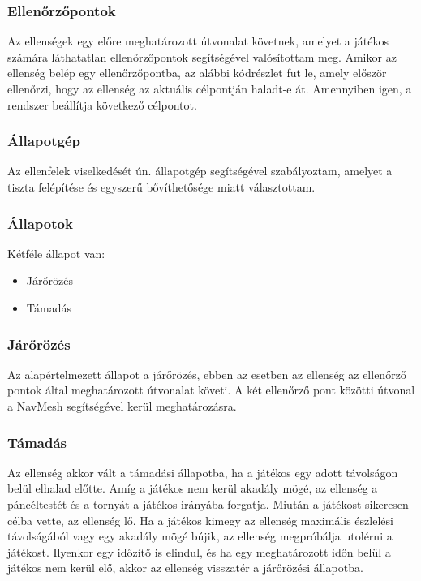 \documentclass[
]{thesis-ekf}
\theoremstyle{definition}
\theoremstyle{remark}
\begin{document}
\subsubsection{Ellenőrzőpontok}

Az ellenségek egy előre meghatározott útvonalat követnek, amelyet a játékos számára láthatatlan ellenőrzőpontok segítségével valósítottam meg. Amikor az ellenség belép egy ellenőrzőpontba, az alábbi kódrészlet fut le, amely először ellenőrzi, hogy az ellenség az aktuális célpontján haladt-e át. Amennyiben igen, a rendszer beállítja következő célpontot.




\subsubsection{Állapotgép}

Az ellenfelek viselkedését ún. állapotgép segítségével szabályoztam, amelyet a tiszta felépítése és egyszerű bővíthetősége miatt választottam.



\subsubsection{Állapotok}

Kétféle állapot van:
\begin{itemize}
 \item Járőrözés
 \item Támadás
\end{itemize}

\subsubsection{Járőrözés}

Az alapértelmezett állapot a járőrözés, ebben az esetben az ellenség az ellenőrző pontok által meghatározott útvonalat követi. A két ellenőrző pont közötti útvonal a NavMesh segítségével kerül meghatározásra.

\subsubsection{Támadás}

Az ellenség akkor vált a támadási állapotba, ha a játékos egy adott távolságon belül elhalad előtte. Amíg a játékos nem kerül akadály mögé, az ellenség a páncéltestét és a tornyát a játékos irányába forgatja. Miután a játékost sikeresen célba vette, az ellenség lő. Ha a játékos kimegy az ellenség maximális észlelési távolságából vagy egy akadály mögé bújik, az ellenség megpróbálja utolérni a játékost. Ilyenkor egy időzítő is elindul, és ha egy meghatározott időn belül a játékos nem kerül elő, akkor az ellenség visszatér a járőrözési állapotba.
\end{document}
